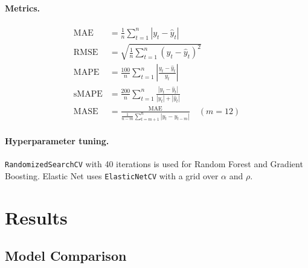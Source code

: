 \documentclass[12pt,a4paper]{article}
\begin{document}
\begin{table}[H]
\paragraph{Metrics.}
\begin{align}
    \text{MAE}   &= \frac{1}{n}\sum_{t=1}^{n} |y_t - \hat{y}_t| \\
    \text{RMSE}  &= \sqrt{\frac{1}{n}\sum_{t=1}^{n} (y_t - \hat{y}_t)^2} \\
    \text{MAPE}  &= \frac{100}{n}\sum_{t=1}^{n}
                    \left|\frac{y_t - \hat{y}_t}{y_t}\right| \\
    \text{sMAPE} &= \frac{200}{n}\sum_{t=1}^{n}
                    \frac{|y_t - \hat{y}_t|}{|y_t| + |\hat{y}_t|} \\
    \text{MASE}  &= \frac{\text{MAE}}{\frac{1}{n-m}\sum_{t=m+1}^{n}
                    |y_t - y_{t-m}|}
                    \quad (m = 12)
\end{align}

\paragraph{Hyperparameter tuning.}
\texttt{RandomizedSearchCV} with 40 iterations is used for Random Forest
and Gradient Boosting. Elastic Net uses \texttt{ElasticNetCV} with a
grid over $\alpha$ and $\rho$.


\section{Results}
\label{sec:results}

\subsection{Model Comparison}


\end{table}
\end{document}
